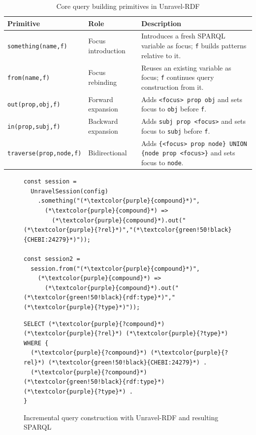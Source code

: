 \documentclass[
]{ceurart}
\begin{document}
\begin{table}[t]
\centering
\setlength{\tabcolsep}{3pt}
{\footnotesize
\caption{Core query building primitives in Unravel-RDF}
\label{tab:query-primitives}
\begin{tabular}{|l|p{3cm}|p{6cm}|}
\hline
\textbf{Primitive} & \textbf{Role} & \textbf{Description} \\
\hline
\texttt{something(name,f)} 
  & Focus introduction 
  & Introduces a fresh SPARQL variable as focus; \texttt{f} builds patterns relative to it. \\
\hline
\texttt{from(name,f)} 
  & Focus rebinding 
  & Reuses an existing variable as focus; \texttt{f} continues query construction from it. \\
\hline
\texttt{out(prop,obj,f)} 
  & Forward expansion 
  & Adds \texttt{<focus> prop obj} and sets focus to \texttt{obj} before \texttt{f}. \\
\hline
\texttt{in(prop,subj,f)} 
  & Backward expansion 
  & Adds \texttt{subj prop <focus>} and sets focus to \texttt{subj} before \texttt{f}. \\
\hline
\texttt{traverse(prop,node,f)} 
  & Bidirectional 
  & Adds \texttt{\{<focus> prop node\} UNION \{node prop <focus>\}} and sets focus to \texttt{node}. \\
\hline
\end{tabular}
}
\end{table}

\begin{figure}[t]
\centering
\caption{Incremental query construction with Unravel-RDF and resulting SPARQL}
\label{fig:unravel-sparql-example}

{\footnotesize
\begin{minipage}[t]{0.50\textwidth}
\centering
\begin{lstlisting}[style=unraveljs,basicstyle=\footnotesize\ttfamily]
const session =
  UnravelSession(config)
    .something("(*\textcolor{purple}{compound}*)",
      (*\textcolor{purple}{compound}*) =>
        (*\textcolor{purple}{compound}*).out("(*\textcolor{purple}{?rel}*)","(*\textcolor{green!50!black}{CHEBI:24279}*)"));

const session2 =
  session.from("(*\textcolor{purple}{compound}*)",
    (*\textcolor{purple}{compound}*) =>
      (*\textcolor{purple}{compound}*).out("(*\textcolor{green!50!black}{rdf:type}*)","(*\textcolor{purple}{?type}*)"));
\end{lstlisting}
\end{minipage}%
\hspace{0.02\textwidth}%
\begin{minipage}[t]{0.44  \textwidth}
\centering
\begin{lstlisting}[style=sparqlstyle,basicstyle=\footnotesize\ttfamily]
SELECT (*\textcolor{purple}{?compound}*) (*\textcolor{purple}{?rel}*) (*\textcolor{purple}{?type}*)
WHERE {
  (*\textcolor{purple}{?compound}*) (*\textcolor{purple}{?rel}*) (*\textcolor{green!50!black}{CHEBI:24279}*) .
  (*\textcolor{purple}{?compound}*) (*\textcolor{green!50!black}{rdf:type}*) (*\textcolor{purple}{?type}*) .
}
\end{lstlisting}
\end{minipage}
}
\end{figure}
\end{document}
